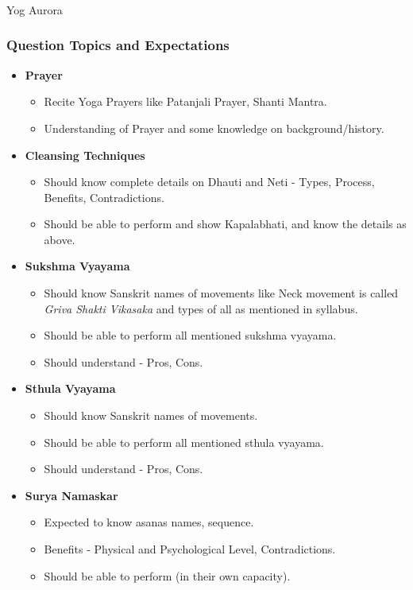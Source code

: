 \begin{frame}[fragile]\frametitle{}
\begin{center}
{\Large Yog Aurora}
\end{center}
\end{frame}

\begin{frame}[fragile]\frametitle{Question Topics and Expectations}
    \begin{itemize}
        \item \textbf{Prayer}
        \begin{itemize}
            \item Recite Yoga Prayers like Patanjali Prayer, Shanti Mantra.
            \item Understanding of Prayer and some knowledge on background/history.
        \end{itemize}
        \item \textbf{Cleansing Techniques}
        \begin{itemize}
            \item Should know complete details on Dhauti and Neti - Types, Process, Benefits, Contradictions.
            \item Should be able to perform and show Kapalabhati, and know the details as above.
        \end{itemize}
        \item \textbf{Sukshma Vyayama}
        \begin{itemize}
            \item Should know Sanskrit names of movements like Neck movement is called \textit{Griva Shakti Vikasaka} and types of all as mentioned in syllabus.
            \item Should be able to perform all mentioned sukshma vyayama.
            \item Should understand - Pros, Cons.
        \end{itemize}
        \item \textbf{Sthula Vyayama}
        \begin{itemize}
            \item Should know Sanskrit names of movements.
            \item Should be able to perform all mentioned sthula vyayama.
            \item Should understand - Pros, Cons.
        \end{itemize}
        \item \textbf{Surya Namaskar}
        \begin{itemize}
            \item Expected to know asanas names, sequence.
            \item Benefits - Physical and Psychological Level, Contradictions.
            \item Should be able to perform (in their own capacity).
        \end{itemize}


\end{itemize}
\end{frame}
